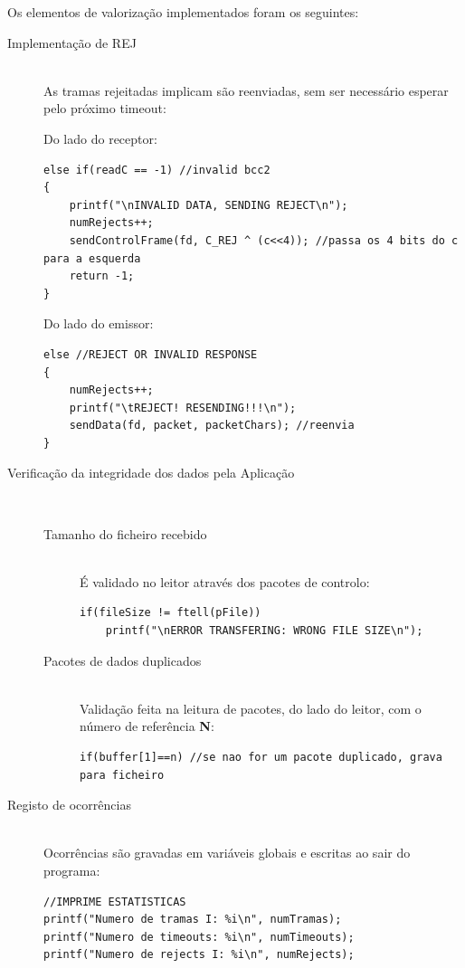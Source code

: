 \documentclass[a4paper,11pt]{article}
\begin{document}
Os elementos de valorização implementados foram os seguintes:

\begin{description}
\item[Implementação de REJ] \hfill \\
As tramas rejeitadas implicam são reenviadas, sem ser necessário esperar pelo próximo timeout:

Do lado do receptor:
\begin{lstlisting}
else if(readC == -1) //invalid bcc2
{
    printf("\nINVALID DATA, SENDING REJECT\n");
    numRejects++;
    sendControlFrame(fd, C_REJ ^ (c<<4)); //passa os 4 bits do c para a esquerda
    return -1;
}
\end{lstlisting}
	Do lado do emissor:
\begin{lstlisting}
else //REJECT OR INVALID RESPONSE
{
    numRejects++;
    printf("\tREJECT! RESENDING!!!\n");
    sendData(fd, packet, packetChars); //reenvia
}
\end{lstlisting}

\item[Verificação da integridade dos dados pela Aplicação] \hfill \\
\begin{description}
\item[Tamanho do ficheiro recebido] \hfill \\
É validado no leitor através dos pacotes de controlo:
\begin{lstlisting}
if(fileSize != ftell(pFile))
    printf("\nERROR TRANSFERING: WRONG FILE SIZE\n");
\end{lstlisting}

\item[Pacotes de dados duplicados] \hfill \\
Validação feita na leitura de pacotes, do lado do leitor, com o número de referência \textbf{N}:

\begin{lstlisting}
if(buffer[1]==n) //se nao for um pacote duplicado, grava para ficheiro
\end{lstlisting}

\end{description}

\item[Registo de ocorrências] \hfill \\
Ocorrências são gravadas em variáveis globais e escritas ao sair do programa:

\begin{lstlisting}
//IMPRIME ESTATISTICAS
printf("Numero de tramas I: %i\n", numTramas);
printf("Numero de timeouts: %i\n", numTimeouts);
printf("Numero de rejects I: %i\n", numRejects);
\end{lstlisting}

\end{description}
\end{document}
